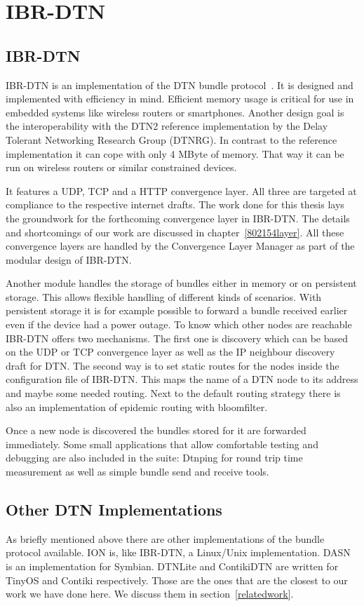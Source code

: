 \chapter{IBR-DTN}
\label{ibr-dtn}
\section{IBR-DTN}

IBR-DTN is an implementation of the DTN bundle protocol~\cite{RFC5050}. It is
designed and implemented with efficiency in mind. Efficient memory usage is critical
for use in embedded systems like wireless routers or smartphones. Another design
goal is the interoperability with the DTN2 reference implementation by the Delay
Tolerant Networking Research Group (DTNRG). In contrast to the reference
implementation it can cope with only 4 MByte of memory. That way it can be run
on wireless routers or similar constrained devices.

It features a UDP, TCP and a HTTP convergence layer. All three are targeted at
compliance to the respective internet drafts. The work done for this thesis lays
the groundwork for the forthcoming convergence layer in IBR-DTN. The details and
shortcomings of our work are discussed in chapter~\ref{802154layer}. All these
convergence layers are handled by the Convergence Layer Manager as part of the
modular design of IBR-DTN.

Another module handles the storage of bundles either in memory or on persistent
storage. This allows flexible handling of different kinds of scenarios. With
persistent storage it is for example possible to forward a bundle received earlier
even if the device had a power outage. To know which other nodes are reachable
IBR-DTN offers two mechanisms. The first one is discovery which can be based on
the UDP or TCP convergence layer as well as the IP neighbour discovery draft for
DTN. The second way is to set static routes for the nodes inside the
configuration file of IBR-DTN. This maps the name of a DTN node to its address
and maybe some needed routing. Next to the default routing strategy there is
also an implementation of epidemic routing with bloomfilter.

Once a new node is discovered the bundles stored for it are forwarded immediately.
Some small applications that allow comfortable testing and debugging are also
included in the suite: Dtnping for round trip time measurement as well as simple bundle
send and receive tools.

\section{Other DTN Implementations}

As briefly mentioned above there are other implementations of the bundle
protocol available. ION is, like IBR-DTN, a Linux/Unix implementation. DASN is
an implementation for Symbian. DTNLite and ContikiDTN are written for TinyOS and
Contiki respectively. Those are the ones that are the closest to our work we
have done here. We discuss them in section~\ref{relatedwork}.

